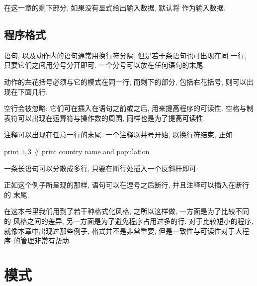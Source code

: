 在这一章的剩下部分, 如果没有显式给出输入数据, 默认将 
作为输入数据.

\subsection{程序格式}
\label{subsec:program_format}

\patact 语句, 以及动作内的语句通常用换行符分隔, 但是若干条语句也可出现在同
一行, 只要它们之间用分号分开即可. 一个分号可以放在任何语句的末尾.

动作的左花括号必须与它的模式在同一行; 而剩下的部分, 包括右花括号, 则可以出
现在下面几行.

空行会被忽略; 它们可在插入在语句之前或之后, 用来提高程序的可读性. 空格与制
表符可以出现在运算符与操作数的周围, 同样也是为了提高可读性.

注释可以出现在任意一行的末尾. 一个注释以井号开始, 以换行符结束, 正如
\begin{awkcode}
    { print $1, $3 }    # print country name and population
\end{awkcode}

一条长语句可以分散成多行, 只要在断行处插入一个反斜杆即可:
正如这个例子所呈现的那样, 语句可以在逗号之后断行, 并且注释可以插入在断行的
末尾.

在这本书里我们用到了若干种格式化风格, 之所以这样做, 一方面是为了比较不同的
风格之间的差异, 另一方面是为了避免程序占用过多的行. 对于比较短小的程序,
就像本章中出现过那些例子, 格式并不是非常重要, 但是一致性与可读性对于大程序
的管理非常有帮助.

\section{模式}
\label{sec:patterns}

